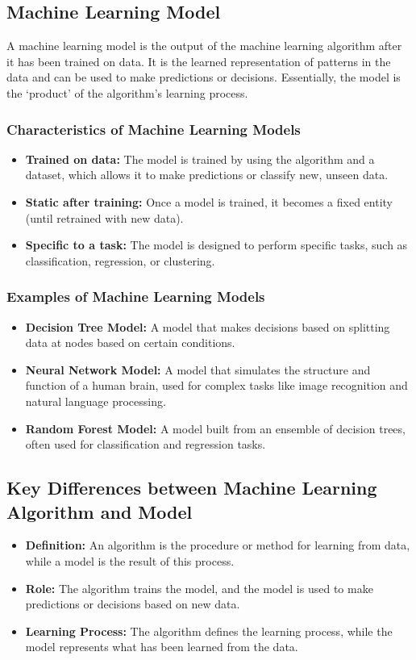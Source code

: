 \subsection*{Machine Learning Model}
A machine learning model is the output of the machine learning algorithm after it has been trained on data. It is the learned representation of patterns in the data and can be used to make predictions or decisions. Essentially, the model is the `product' of the algorithm's learning process.

\subsubsection*{Characteristics of Machine Learning Models}
\begin{itemize}
    \item \textbf{Trained on data:} The model is trained by using the algorithm and a dataset, which allows it to make predictions or classify new, unseen data.
    \item \textbf{Static after training:} Once a model is trained, it becomes a fixed entity (until retrained with new data).
    \item \textbf{Specific to a task:} The model is designed to perform specific tasks, such as classification, regression, or clustering.
\end{itemize}

\subsubsection*{Examples of Machine Learning Models}
\begin{itemize}
    \item \textbf{Decision Tree Model:} A model that makes decisions based on splitting data at nodes based on certain conditions.
    \item \textbf{Neural Network Model:} A model that simulates the structure and function of a human brain, used for complex tasks like image recognition and natural language processing.
    \item \textbf{Random Forest Model:} A model built from an ensemble of decision trees, often used for classification and regression tasks.
\end{itemize}

\subsection*{Key Differences between Machine Learning Algorithm and Model}
\begin{itemize}
    \item \textbf{Definition:} An algorithm is the procedure or method for learning from data, while a model is the result of this process.
    \item \textbf{Role:} The algorithm trains the model, and the model is used to make predictions or decisions based on new data.
    \item \textbf{Learning Process:} The algorithm defines the learning process, while the model represents what has been learned from the data.
\end{itemize}

